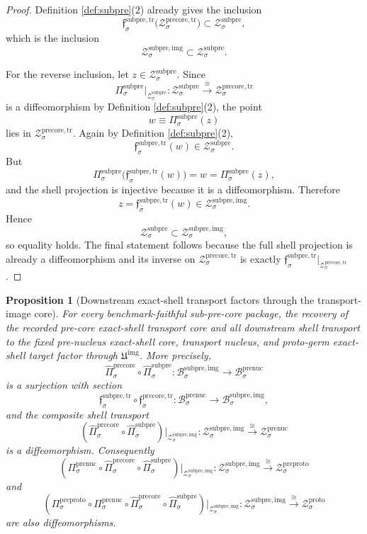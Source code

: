 \documentclass[11pt]{article}
\newcommand{\ProtoShellSet}[1]{\mathcal Z_{#1}^{\mathrm{proto}}}
\newcommand{\PreProtoProj}[1]{\Pi_{#1}^{\mathrm{preproto}}}
\newcommand{\PreProtoShellSet}[1]{\mathcal Z_{#1}^{\mathrm{preproto}}}
\newcommand{\PreNucBody}[1]{\mathcal B_{#1}^{\mathrm{prenuc}}}
\newcommand{\PreNucProj}[1]{\Pi_{#1}^{\mathrm{prenuc}}}
\newcommand{\PreNucShellSet}[1]{\mathcal Z_{#1}^{\mathrm{prenuc}}}
\newcommand{\PreCoreTrProj}[1]{\widehat{\Pi}_{#1}^{\mathrm{precore}}}
\newcommand{\PreCoreTrLift}[1]{\mathfrak f_{#1}^{\mathrm{precore,tr}}}
\newcommand{\PreCoreTrShell}[1]{\mathcal Z_{#1}^{\mathrm{precore,tr}}}
\newcommand{\SubPreCoreProj}[1]{\Pi_{#1}^{\mathrm{subpre}}}
\newcommand{\SubPreCoreTransportMin}[1]{\mathfrak f_{#1}^{\mathrm{subpre,tr}}}
\newcommand{\SubPreCoreShellSet}[1]{\mathcal Z_{#1}^{\mathrm{subpre}}}
\newcommand{\SubPreImageCore}{\mathfrak U^{\mathrm{img}}}
\newcommand{\SubPreImgBody}[1]{\mathcal B_{#1}^{\mathrm{subpre,img}}}
\newcommand{\SubPreImgProj}[1]{\widehat{\Pi}_{#1}^{\mathrm{subpre}}}
\newcommand{\SubPreImgShell}[1]{\mathcal Z_{#1}^{\mathrm{subpre,img}}}
\newtheorem{proposition}{Proposition}
\begin{document}
\begin{proof}
Definition \ref{def:subpre}(2) already gives the inclusion
\[
\SubPreCoreTransportMin{\sigma}\bigl(\PreCoreTrShell{\sigma}\bigr)
\subset
\SubPreCoreShellSet{\sigma},
\]
which is the inclusion
\[
\SubPreImgShell{\sigma}\subset\SubPreCoreShellSet{\sigma}.
\]

For the reverse inclusion, let \(z\in\SubPreCoreShellSet{\sigma}\). Since
\[
\SubPreCoreProj{\sigma}\big|_{\SubPreCoreShellSet{\sigma}}
:
\SubPreCoreShellSet{\sigma}\xrightarrow{\cong}\PreCoreTrShell{\sigma}
\]
is a diffeomorphism by Definition \ref{def:subpre}(2), the point
\[
w\equiv\SubPreCoreProj{\sigma}(z)
\]
lies in \(\PreCoreTrShell{\sigma}\). Again by Definition \ref{def:subpre}(2),
\[
\SubPreCoreTransportMin{\sigma}(w)\in\SubPreCoreShellSet{\sigma}.
\]
But
\[
\SubPreCoreProj{\sigma}\bigl(\SubPreCoreTransportMin{\sigma}(w)\bigr)=w=\SubPreCoreProj{\sigma}(z),
\]
and the shell projection is injective because it is a diffeomorphism. Therefore
\[
z=\SubPreCoreTransportMin{\sigma}(w)\in\SubPreImgShell{\sigma}.
\]
Hence
\[
\SubPreCoreShellSet{\sigma}\subset\SubPreImgShell{\sigma},
\]
so equality holds. The final statement follows because the full shell projection is already a diffeomorphism and its inverse on \(\PreCoreTrShell{\sigma}\) is exactly \(\SubPreCoreTransportMin{\sigma}\big|_{\PreCoreTrShell{\sigma}}\).
\end{proof}

\begin{proposition}[Downstream exact-shell transport factors through the transport-image core]
\label{prop:downstream}
For every benchmark-faithful sub-pre-core package, the recovery of the recorded pre-core exact-shell transport core and all downstream shell transport to the fixed pre-nucleus exact-shell core, transport nucleus, and proto-germ exact-shell target factor through \(\SubPreImageCore\). More precisely,
\[
\PreCoreTrProj{\sigma}\circ\SubPreImgProj{\sigma}
:
\SubPreImgBody{\sigma}\to\PreNucBody{\sigma}
\]
is a surjection with section
\[
\SubPreCoreTransportMin{\sigma}\circ\PreCoreTrLift{\sigma}
:
\PreNucBody{\sigma}\to\SubPreImgBody{\sigma},
\]
and the composite shell transport
\[
(\PreCoreTrProj{\sigma}\circ\SubPreImgProj{\sigma})\big|_{\SubPreImgShell{\sigma}}
:
\SubPreImgShell{\sigma}
\xrightarrow{\cong}
\PreNucShellSet{\sigma}
\]
is a diffeomorphism. Consequently
\[
(\PreNucProj{\sigma}\circ\PreCoreTrProj{\sigma}\circ\SubPreImgProj{\sigma})\big|_{\SubPreImgShell{\sigma}}
:
\SubPreImgShell{\sigma}
\xrightarrow{\cong}
\PreProtoShellSet{\sigma}
\]
and
\[
(\PreProtoProj{\sigma}\circ\PreNucProj{\sigma}\circ\PreCoreTrProj{\sigma}\circ\SubPreImgProj{\sigma})\big|_{\SubPreImgShell{\sigma}}
:
\SubPreImgShell{\sigma}
\xrightarrow{\cong}
\ProtoShellSet{\sigma}
\]
are also diffeomorphisms.
\end{proposition}
\end{document}
